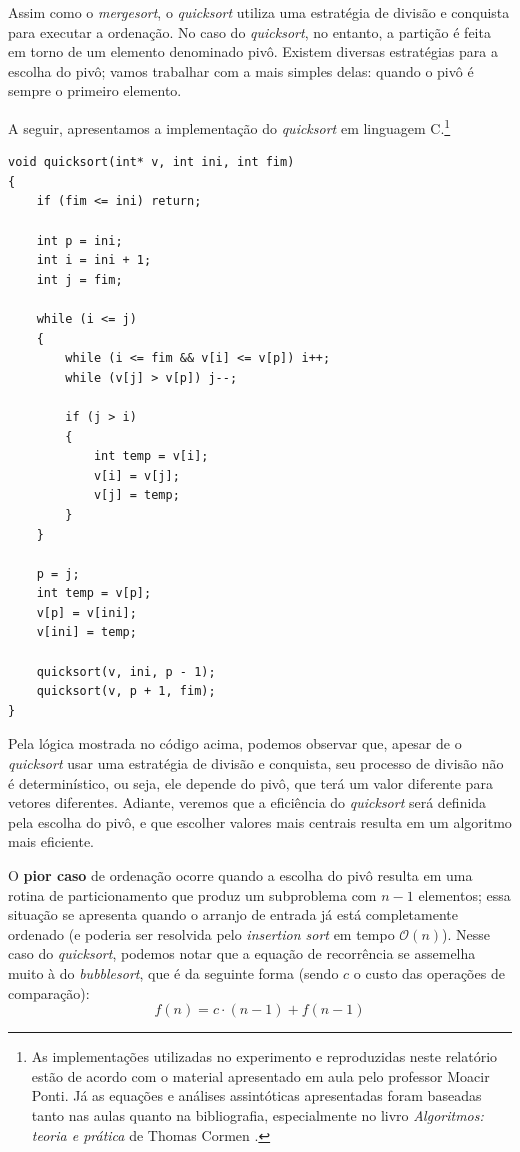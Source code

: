 \documentclass[fontsize=10pt]{article}
\begin{document}
\quad Assim como o \textit{mergesort}, o \textit{quicksort} utiliza uma estratégia de divisão e conquista para executar a ordenação. No caso do \textit{quicksort}, no entanto, a partição é feita em torno de um elemento denominado pivô. Existem diversas estratégias para a escolha do pivô; vamos trabalhar com a mais simples delas: quando o pivô é sempre o primeiro elemento.

\quad A seguir, apresentamos a implementação do \textit{quicksort} em linguagem C.\footnote{As implementações utilizadas no experimento e reproduzidas neste relatório estão de acordo com o material apresentado em aula pelo professor Moacir Ponti\cite{moacir}. Já as equações e análises assintóticas apresentadas foram baseadas tanto nas aulas quanto na bibliografia, especialmente no livro \textit{Algoritmos: teoria e prática} de Thomas Cormen \cite{cormen}.}

\begin{lstlisting}
void quicksort(int* v, int ini, int fim)
{
    if (fim <= ini) return;

    int p = ini;
    int i = ini + 1;
    int j = fim; 
    
    while (i <= j)
    {
        while (i <= fim && v[i] <= v[p]) i++;
        while (v[j] > v[p]) j--;

        if (j > i)
        {
            int temp = v[i];
            v[i] = v[j];
            v[j] = temp;
        }
    }

    p = j;
    int temp = v[p];
    v[p] = v[ini];
    v[ini] = temp;

    quicksort(v, ini, p - 1);
    quicksort(v, p + 1, fim);
}
\end{lstlisting}

\quad Pela lógica mostrada no código acima, podemos observar que, apesar de o \textit{quicksort} usar uma estratégia de divisão e conquista, seu processo de divisão não é determinístico, ou seja, ele depende do pivô, que terá um valor diferente para vetores diferentes. Adiante, veremos que a eficiência do \textit{quicksort} será definida pela escolha do pivô, e que escolher valores mais centrais resulta em um algoritmo mais eficiente.

\quad O \textbf{pior caso} de ordenação ocorre quando a escolha do pivô resulta em uma rotina de particionamento que produz um subproblema com $n - 1$ elementos; essa situação se apresenta quando o arranjo de entrada já está completamente ordenado (e poderia ser resolvida pelo \textit{insertion sort} em tempo $\mathcal{O}(n)$). \cite{cormen} Nesse caso do \textit{quicksort}, podemos notar que a equação de recorrência se assemelha muito à do \textit{bubblesort}, que é da seguinte forma (sendo $c$ o custo das operações de comparação):
\[f(n) = c \cdot (n - 1) + f(n - 1)\]
\end{document}
